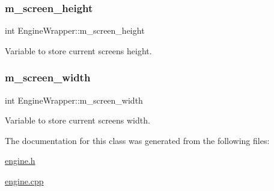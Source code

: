 \mbox{\label{classEngineWrapper_a493a1f3303ab70c4dc90145e57ea3eaf}} 
\subsubsection{\texorpdfstring{m\+\_\+screen\+\_\+height}{m\_screen\_height}}
{\footnotesize\ttfamily int Engine\+Wrapper\+::m\+\_\+screen\+\_\+height\hspace{0.3cm}{\ttfamily [private]}}



Variable to store current screen\textquotesingle{}s height. 

\mbox{\label{classEngineWrapper_a53d49d56ab2b6e1ec9d34c2826f09f78}} 
\subsubsection{\texorpdfstring{m\+\_\+screen\+\_\+width}{m\_screen\_width}}
{\footnotesize\ttfamily int Engine\+Wrapper\+::m\+\_\+screen\+\_\+width\hspace{0.3cm}{\ttfamily [private]}}



Variable to store current screen\textquotesingle{}s width. 



The documentation for this class was generated from the following files\+:\begin{DoxyCompactItemize}
\item 
\hyperlink{engine_8h}{engine.\+h}\item 
\hyperlink{engine_8cpp}{engine.\+cpp}\end{DoxyCompactItemize}
